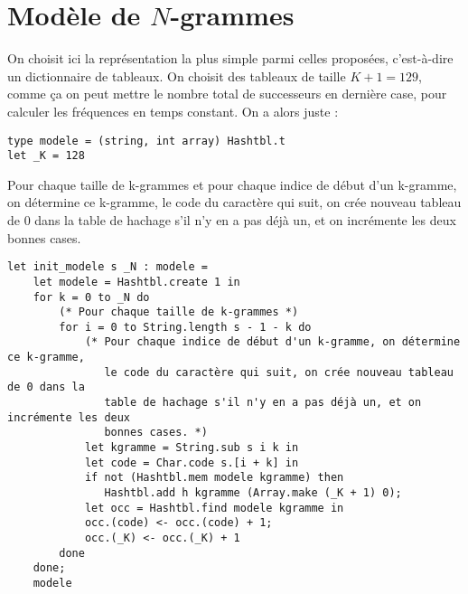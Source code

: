 \documentclass[10pt]{article}
\begin{document}
\section{Modèle de $N$-grammes}


\begin{Exercise}
On choisit ici la représentation la plus simple parmi celles proposées, c'est-à-dire un dictionnaire de tableaux. On choisit des tableaux de taille $K+1 = 129$, comme ça on peut mettre le nombre total de successeurs en dernière case, pour calculer les fréquences en temps constant. On a alors juste :

\begin{cbox}
   \begin{verbatim}
type modele = (string, int array) Hashtbl.t
let _K = 128
   \end{verbatim}
\end{cbox}
\end{Exercise}

\begin{Exercise}
Pour chaque taille de k-grammes et pour chaque indice de début d'un k-gramme, on détermine ce k-gramme, le code du caractère qui suit, on crée nouveau tableau de 0 dans la table de hachage s'il n'y en a pas déjà un, et on incrémente les deux bonnes cases.
\begin{cbox}
   \begin{verbatim}
let init_modele s _N : modele =
    let modele = Hashtbl.create 1 in
    for k = 0 to _N do
        (* Pour chaque taille de k-grammes *)
        for i = 0 to String.length s - 1 - k do
            (* Pour chaque indice de début d'un k-gramme, on détermine ce k-gramme,
               le code du caractère qui suit, on crée nouveau tableau de 0 dans la
               table de hachage s'il n'y en a pas déjà un, et on incrémente les deux
               bonnes cases. *)
            let kgramme = String.sub s i k in
            let code = Char.code s.[i + k] in
            if not (Hashtbl.mem modele kgramme) then 
               Hashtbl.add h kgramme (Array.make (_K + 1) 0);
            let occ = Hashtbl.find modele kgramme in
            occ.(code) <- occ.(code) + 1;
            occ.(_K) <- occ.(_K) + 1
        done
    done;
    modele
   \end{verbatim}
\end{cbox}
\end{Exercise}
\end{document}

